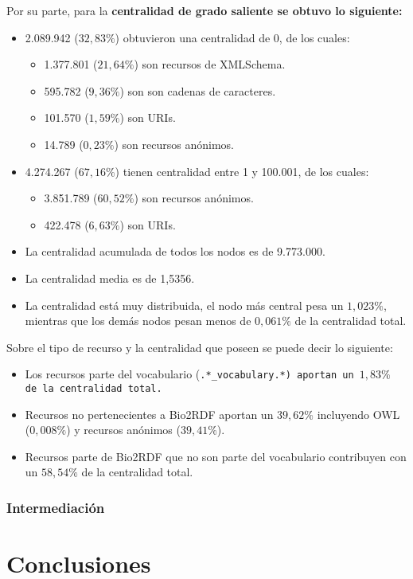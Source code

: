 Por su parte, para la \bf{centralidad de grado saliente} se obtuvo lo siguiente:
\begin{itemize}
  \item 2.089.942 ($32,83\%$) obtuvieron una centralidad de 0, de los cuales:
    \begin{itemize}
      \item 1.377.801 ($21,64\%$) son recursos de XMLSchema.
      \item 595.782 ($9,36\%$) son son cadenas de caracteres.
      \item 101.570 ($1,59\%$) son URIs.
      \item 14.789 ($0,23\%$) son recursos anónimos.
    \end{itemize}
  \item
    4.274.267 ($67,16\%$) tienen centralidad entre 1 y 100.001, de los cuales:
    \begin{itemize}
      \item 3.851.789 ($60,52\%$) son recursos anónimos.
      \item 422.478 ($6,63\%$) son URIs.
    \end{itemize}
  \item La centralidad acumulada de todos los nodos es de 9.773.000.
  \item La centralidad media es de 1,5356.
  \item 
    La centralidad está muy distribuida, el nodo más central pesa un $1,023\%$,
    mientras que los demás nodos pesan menos de $0,061\%$ de la centralidad
    total.
\end{itemize}
Sobre el tipo de recurso y la centralidad que poseen se puede decir lo
siguiente:
\begin{itemize}
  \item 
    Los recursos parte del vocabulario (\tt{.*\_vocabulary.*}) aportan un 
    $1,83\%$ de la centralidad total.
  \item
    Recursos no pertenecientes a Bio2RDF aportan un $39,62\%$ incluyendo OWL 
    ($0,008\%$) y recursos anónimos ($39,41\%$).
  \item 
    Recursos parte de Bio2RDF que no son parte del vocabulario contribuyen con
    un $58,54\%$ de la centralidad total.
\end{itemize}


\subsubsection{Intermediación}


\section{Conclusiones}\label{sec:con}

